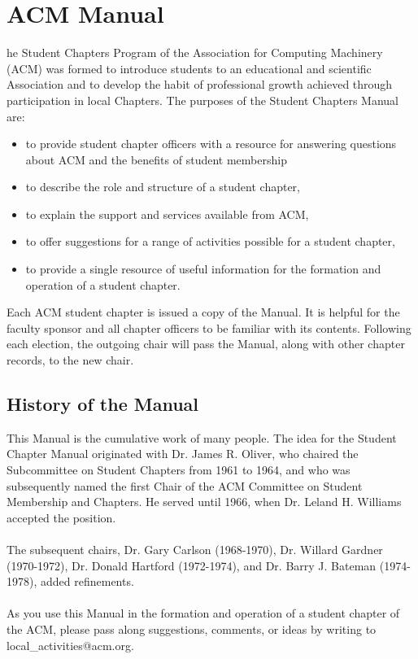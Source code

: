 %
%
\let\textcircled=\pgftextcircled
\chapter{ACM Manual}
\label{chap:manual}

he Student Chapters Program of the Association for Computing Machinery (ACM) was formed to introduce students to an educational and scientific Association and to develop the habit of professional growth achieved through participation in local Chapters. The purposes of the Student Chapters Manual are:
	\begin{itemize}
		\item to provide student chapter officers with a resource for answering 				questions about ACM and the benefits of student membership
        \item to describe the role and structure of a student chapter,
		\item to explain the support and services available from ACM,
		\item to offer suggestions for a range of activities possible for a student 			chapter,
		\item to provide a single resource of useful information for the formation 				and operation of a student chapter.
	\end{itemize}
    
Each ACM student chapter is issued a copy of the Manual. It is helpful for the faculty sponsor and all chapter officers to be familiar with its contents. Following each election, the outgoing chair will pass the Manual, along with other chapter records, to the new chair.

\section{History of the Manual}
\label{sec:sec01}

This Manual is the cumulative work of many people. The idea for the Student Chapter Manual originated with Dr. James R. Oliver, who chaired the Subcommittee on Student Chapters from 1961 to 1964, and who was subsequently named the first Chair of the ACM Committee on Student Membership and Chapters. He served until 1966, when Dr. Leland H. Williams accepted the position.
\\
\\
The subsequent chairs, Dr. Gary Carlson (1968-1970), Dr. Willard Gardner (1970-1972), Dr. Donald Hartford (1972-1974), and Dr. Barry J. Bateman (1974-1978), added refinements.
\\
\\
As you use this Manual in the formation and operation of a student chapter of the ACM, please pass along suggestions, comments, or ideas by writing to local\_activities@acm.org.

